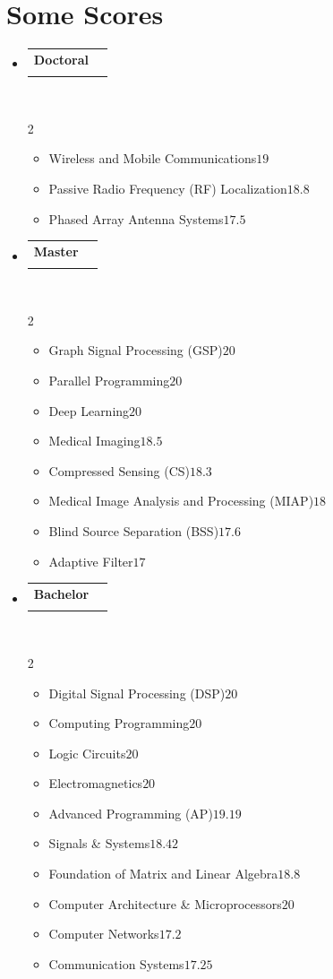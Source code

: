 \documentclass[a4paper,11pt]{article}
\makeatletter
\newcommand{\resumeItemScore}[2]{\item[]\small#1\hfill#2}
\newcommand{\resumeItemListStart}{\begin{itemize}[rightmargin=0.11in]}
\newcommand{\resumeItemListEnd}{\end{itemize}}
\newcommand{\resumeQuadHeading}[4]{
\item
\begin{tabular*}{\linewidth}[t]{l@{\extracolsep{\fill}}r}
\textbf{#1} & #2 \\
\textit{\small#3} & \textit{\small #4} \\
\end{tabular*}
}
\newcommand{\resumeHeadingListStart}{
\begin{itemize}[leftmargin=0.15in, label={}]
}
\newcommand{\resumeHeadingListEnd}{\end{itemize}}
\makeatother
\begin{document}
\section{Some Scores}
%
\resumeHeadingListStart{}
\resumeQuadHeading{Doctoral}{}{}{}\\\vspace{-1.5em}
\begin{multicols}{2}
\resumeItemListStart{}
\resumeItemScore{Wireless and Mobile Communications}{$19$}
\resumeItemScore{Passive Radio Frequency (RF) Localization}{$18.8$}
\resumeItemScore{Phased Array Antenna Systems}{$17.5$}
\resumeItemListEnd{}
\end{multicols}



\resumeQuadHeading{Master}{}{}{}\\\vspace{-1.5em}
\begin{multicols}{2}
\resumeItemListStart{}
\resumeItemScore{Graph Signal Processing (GSP)}{$20$}
\resumeItemScore{Parallel Programming}{$20$}
\resumeItemScore{Deep Learning}{$20$}
\resumeItemScore{Medical Imaging}{$18.5$}
\resumeItemScore{Compressed Sensing (CS)}{$18.3$}
\resumeItemScore{Medical Image Analysis and Processing (MIAP)}{$18$}
\resumeItemScore{Blind Source Separation (BSS)}{$17.6$}
\resumeItemScore{Adaptive Filter}{$17$}
\resumeItemListEnd{}
\end{multicols}


\resumeQuadHeading{Bachelor}{}{}{}\\\vspace{-1.5em}
\begin{multicols}{2}
\resumeItemListStart{}
\resumeItemScore{Digital Signal Processing (DSP)}{$20$}
\resumeItemScore{Computing Programming}{$20$}
\resumeItemScore{Logic Circuits}{$20$}
\resumeItemScore{Electromagnetics}{$20$}
\resumeItemScore{Advanced Programming (AP)}{$19.19$}
\resumeItemScore{Signals \& Systems}{$18.42$}
\resumeItemScore{Foundation of Matrix and Linear Algebra}{$18.8$}
\resumeItemScore{Computer Architecture \& Microprocessors}{$20$}
\resumeItemScore{Computer Networks}{$17.2$}
\resumeItemScore{Communication Systems}{$17.25$}
\resumeItemListEnd{}
\end{multicols}

\resumeHeadingListEnd{}


%


\end{document}
